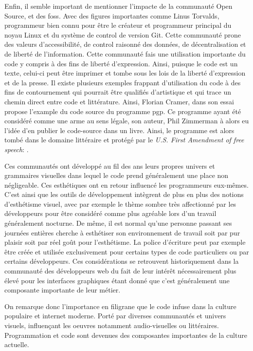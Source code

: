\documentclass[12pt]{article} %
\begin{document}
Enfin, il semble important de mentionner l'impacte de la communauté Open Source, et des \acrshort{foss}. Avec des figures importantes comme Linus Torvalds, programmeur bien connu pour être le créateur et programmeur principal du noyau Linux et du système de control de version Git. Cette communauté prone des valeurs d'accessibilité, de control raisonné des données, de décentralisation et de liberté de l'information. Cette communauté fais une utilisation importante du code y compris à des fins de liberté d'expression. Ainsi, puisque le code est un texte, celui-ci peut être imprimer et tombe sous les lois de la liberté d'expression et de la presse. Il existe plusieurs exemples frappant d'utilisation du code à des fins de contournement qui pourrait être qualifiés d'artistique et qui trace un chemin direct entre code et littérature. Ainsi, Florian Cramer, dans son essai  propose l'example du code source du programme \acrshort{pgp}. Ce programme ayant été considéré comme une arme au sens légale, son auteur, Phil Zimmerman à alors eu l'idée d'en publier le code-source dans un livre. Ainsi, le programme est alors tombé dans le domaine littéraire et protégé par le \textit{U.S. First Amendment of free speech}:  \cite{FCramer2001}.

Ces communautés ont développé au fil des ans leurs propres univers et grammaires visuelles dans lequel le code prend généralement une place non négligeable. Ces esthétiques ont en retour influencé les programmeurs eux-mêmes. C'est ainsi que les outils de développement intègrent de plus en plus des notions d'esthétisme visuel, avec par exemple le thème sombre très affectionné par les développeurs pour être considéré comme plus agréable lors d'un travail généralement nocturne. De même, il est normal qu'une personne passant ses journées entières cherche à esthétiser son environnement de travail soit par pur plaisir soit par réel goût pour l'esthétisme. La police d'écriture peut par exemple être créée et utilisée exclusivement pour certains types de code particuliers ou par certains développeurs. Ces considérations se retrouvent historiquement dans la communauté des développeurs web du fait de leur intérêt nécessairement plus élevé pour les interfaces graphiques étant donné que c'est généralement une composante importante de leur métier. 

On remarque donc l'importance en filigrane que le code infuse dans la culture populaire et internet moderne. Porté par diverses communautés et univers visuels, influençant les oeuvres notamment audio-visuelles ou littéraires. Programmation et code sont devenues des composantes importantes de la culture actuelle.  
\end{document}
